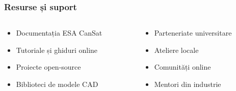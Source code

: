 \begin{frame}
\frametitle{Resurse și suport}
\begin{columns}[T]
    \begin{column}{0.45\textwidth}
        \vspace{0.3cm}
        \small
        \begin{itemize}
            \item Documentația ESA CanSat
            \item Tutoriale și ghiduri online
            \item Proiecte open-source
            \item Biblioteci de modele CAD
        \end{itemize}
    \end{column}
    \begin{column}{0.45\textwidth}
        \vspace{0.3cm}
        \small
        \begin{itemize}
            \item Parteneriate universitare
            \item Ateliere locale
            \item Comunități online
            \item Mentori din industrie
        \end{itemize}
    \end{column}
\end{columns}

\bcolorbar
\end{frame}